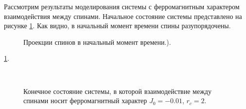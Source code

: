 \documentclass[14pt,a4paper,report]{ncc}
\begin{document}
Рассмотрим результаты моделирования системы с ферромагнитным характером взаимодействия между спинами. Начальное состояние системы представлено на рисунке \ref{ris:image1}. Как видно, в начальный момент времени спины разупорядочены.
\

\begin{figure}[b]
\caption{Проекции спинов в начальный момент времени.).}
\label{ris:image1}
\end{figure}
\ref{ris:image1}. 


\
\begin{figure}[h]
\begin{minipage}[h]{0.49\linewidth}
\end{minipage}
\hfill
\begin{minipage}[h]{0.49\linewidth}
\end{minipage}
\caption{Конечное состояние системы, в которой взаимодействие между спинами носит ферромагнитный характер $J_0=-0.01$, $r_c=2$.}
\label{ris:image2}
\end{figure}
\end{document}
